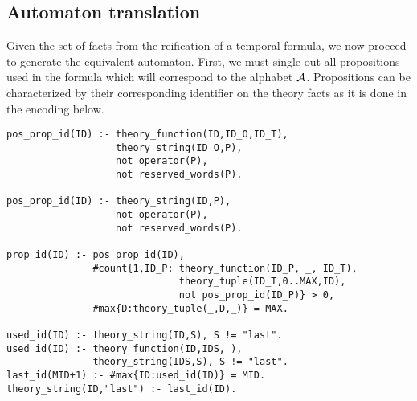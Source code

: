 \subsection{Automaton translation  }

Given the set of facts from the reification of a temporal formula, we now proceed to generate the equivalent automaton. First, we must single out all propositions used in the formula which will correspond to the alphabet $\mathcal{A }$. Propositions can be characterized by their corresponding identifier on the theory facts as it is done in the encoding below. 

\begin{center}
    \begin{lstlisting}[] 
pos_prop_id(ID) :- theory_function(ID,ID_O,ID_T),
                   theory_string(ID_O,P), 
                   not operator(P),
                   not reserved_words(P).

pos_prop_id(ID) :- theory_string(ID,P),
                   not operator(P), 
                   not reserved_words(P).

prop_id(ID) :- pos_prop_id(ID), 
               #count{1,ID_P: theory_function(ID_P, _, ID_T),
                              theory_tuple(ID_T,0..MAX,ID),
                              not pos_prop_id(ID_P)} > 0, 
               #max{D:theory_tuple(_,D,_)} = MAX.

used_id(ID) :- theory_string(ID,S), S != "last".
used_id(ID) :- theory_function(ID,IDS,_), 
               theory_string(IDS,S), S != "last".
last_id(MID+1) :- #max{ID:used_id(ID)} = MID.
theory_string(ID,"last") :- last_id(ID).

    \end{lstlisting}
\end{center}

